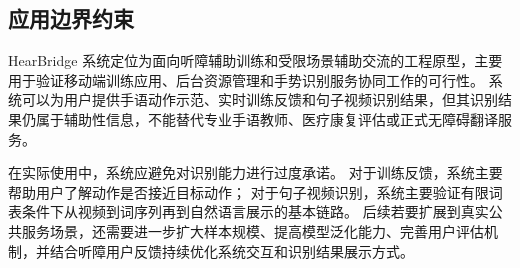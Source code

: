 \subsection{应用边界约束}

HearBridge 系统定位为面向听障辅助训练和受限场景辅助交流的工程原型，主要用于验证移动端训练应用、后台资源管理和手势识别服务协同工作的可行性。
系统可以为用户提供手语动作示范、实时训练反馈和句子视频识别结果，但其识别结果仍属于辅助性信息，不能替代专业手语教师、医疗康复评估或正式无障碍翻译服务。

在实际使用中，系统应避免对识别能力进行过度承诺。
对于训练反馈，系统主要帮助用户了解动作是否接近目标动作；
对于句子视频识别，系统主要验证有限词表条件下从视频到词序列再到自然语言展示的基本链路。
后续若要扩展到真实公共服务场景，还需要进一步扩大样本规模、提高模型泛化能力、完善用户评估机制，并结合听障用户反馈持续优化系统交互和识别结果展示方式。
